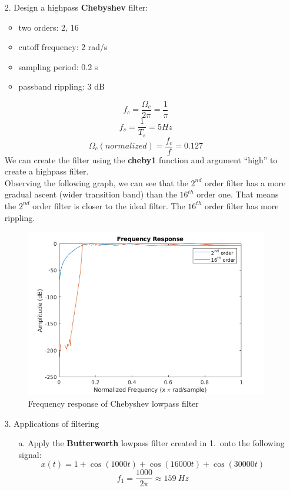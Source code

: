 \documentclass[12pt, a4paper]{article}
\begin{document}
\begin{enumerate}
    \item[2.] Design a highpass \textbf{Chebyshev} filter:
    \begin{itemize}
        \item two orders: 2, 16
        \item cutoff frequency: 2 rad/s
        \item sampling period: 0.2 s
        \item passband rippling: 3 dB
    \end{itemize}
    \[f_c = \frac{\Omega_c}{2\pi} = \frac{1}{\pi}\]
    \[f_s = \frac{1}{T_s} = 5 Hz\]
    \[\Omega_c(normalized) = \frac{f_c}{f} = 0.127 \]
    We can create the filter using the \textbf{cheby1} function and argument ``high'' to create a highpass filter.\\
    Observing the following graph, we can see that the \(2^{nd}\) order filter has a more gradual ascent (wider transition band) than the \(16^{th}\)
    order one. That means the \(2^{nd}\) order filter is closer to the ideal filter. The \(16^{th}\) order filter has more rippling.
    \begin{figure}[H]
        \centering
        \includegraphics[scale=0.8]{cheby.png}
        \caption{Frequency response of Chebyshev lowpass filter}
    \end{figure}
    \item[3.] Applications of filtering
    \begin{enumerate}
        \item[a.] Apply the \textbf{Butterworth} lowpass filter created in 1.\ onto the following signal:
        \[x(t) = 1 + \cos(1000t) + \cos(16000t) + \cos(30000t)\]
        \[f_1 = \frac{1000}{2\pi} \approx 159\ Hz\]

\end{enumerate}
\end{enumerate}
\end{document}

